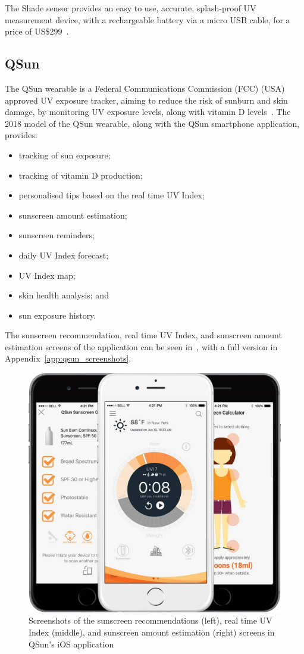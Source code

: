 \documentclass[12pt,openany,a4paper]{book}
\newcommand{\fig}[1]  {Fig.\,\ref{#1}}		%
\newcommand{\app}[1]  {Appendix~\ref{#1}}	%
\begin{document}
The Shade sensor provides an easy to use, accurate, splash-proof UV measurement
device, with a rechargeable battery via a micro USB cable, for a price of
US\$299~\cite{wearshade_store}.

\subsection{QSun}

The QSun wearable is a Federal Communications Commission (FCC) (USA) approved UV
exposure tracker, aiming to reduce the risk of sunburn and skin damage, by
monitoring UV exposure levels, along with vitamin D levels~\cite{qsun_intro}. The 2018
model of the QSun wearable, along with the QSun smartphone application,
provides:

\begin{itemize}
	\item tracking of sun exposure;
	\item tracking of vitamin D production;
	\item personalised tips based on the real time UV Index;
	\item sunscreen amount estimation;
	\item sunscreen reminders;
	\item daily UV Index forecast;
	\item UV Index map;
	\item skin health analysis; and
	\item sun exposure history.
\end{itemize}

The sunscreen recommendation, real time UV Index, and sunscreen amount
estimation screens of the application can be seen
in~\cite[\fig{fig:qsun_screenshots}]{qsun_features}, with a full version in
\app{app:qsun_screenshots}.

\begin{figure}[h]
\centerline{\includegraphics[width=.5\textwidth]{QSunApp.jpg}}
\caption{Screenshots of the sunscreen recommendations (left), real time UV Index
(middle), and sunscreen amount estimation (right) screens in QSun's iOS
application}
\label{fig:qsun_screenshots}
\end{figure}
\end{document}
